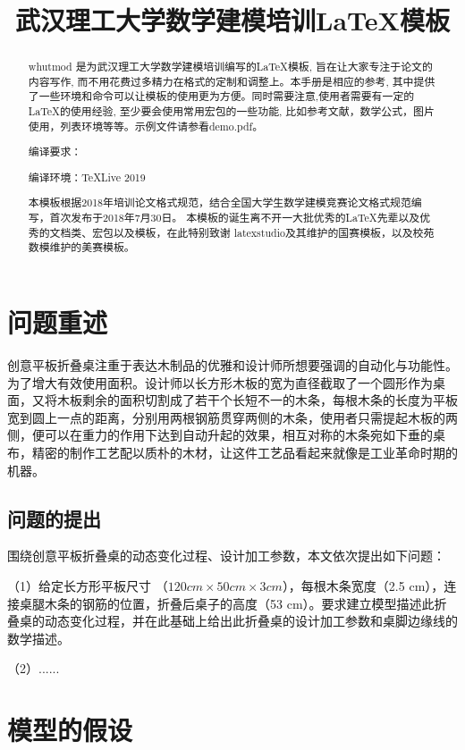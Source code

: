 \documentclass{whutmod}
\title{武汉理工大学数学建模培训\LaTeX 模板}
\begin{document}
\maketitle

\begin{abstract}
	whutmod 是为武汉理工大学数学建模培训编写的\LaTeX 模板, 旨在让大家专注于论文的内容写作, 而不用花费过多精力在格式的定制和调整上。本手册是相应的参考, 其中提供了一些环境和命令可以让模板的使用更为方便。同时需要注意,使用者需要有一定的\LaTeX 的使用经验, 至少要会使用常用宏包的一些功能, 比如参考文献，数学公式，图片使用，列表环境等等。示例文件请参看demo.pdf。
	
	编译要求：\XeLaTeX
	
	编译环境：\TeX Live 2019
	
	本模板根据2018年培训论文格式规范，结合全国大学生数学建模竞赛论文格式规范编写，首次发布于2018年7月30日。
	本模板的诞生离不开一大批优秀的\LaTeX 先辈以及优秀的文档类、宏包以及模板，在此特别致谢 latexstudio及其维护的国赛模板，以及校苑数模维护的美赛模板。
	
\end{abstract}
\section{问题重述}

创意平板折叠桌注重于表达木制品的优雅和设计师所想要强调的自动化与功能性。为了增大有效使用面积。设计师以长方形木板的宽为直径截取了一个圆形作为桌面，又将木板剩余的面积切割成了若干个长短不一的木条，每根木条的长度为平板宽到圆上一点的距离，分别用两根钢筋贯穿两侧的木条，使用者只需提起木板的两侧，便可以在重力的作用下达到自动升起的效果，相互对称的木条宛如下垂的桌布，精密的制作工艺配以质朴的木材，让这件工艺品看起来就像是工业革命时期的机器。

\subsection{问题的提出}

围绕创意平板折叠桌的动态变化过程、设计加工参数，本文依次提出如下问题：

（1）给定长方形平板尺寸 （$120 cm \times 50 cm \times 3 cm$），每根木条宽度（2.5 cm），连接桌腿木条的钢筋的位置，折叠后桌子的高度（53 cm）。要求建立模型描述此折叠桌的动态变化过程，并在此基础上给出此折叠桌的设计加工参数和桌脚边缘线的数学描述。

（2）......


\section{模型的假设}
\end{document}
